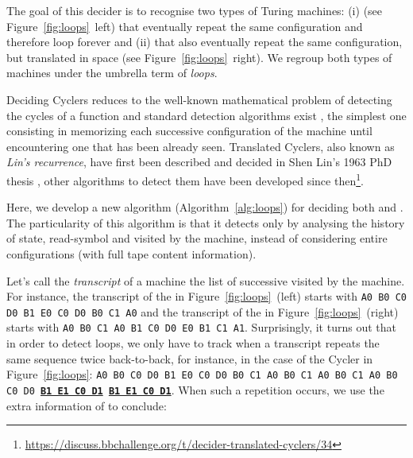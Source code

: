 
The goal of this decider is to recognise two types of Turing machines: (i) \textit{\cyclers} (see Figure~\ref{fig:loops}~left) that eventually repeat the same configuration and therefore loop forever and (ii) \textit{\TCs} that also eventually repeat the same configuration, but translated in space (see Figure~\ref{fig:loops}~right). We regroup both types of machines under the umbrella term of \textit{loops}.

Deciding Cyclers reduces to the well-known mathematical problem of detecting the cycles of a function and standard detection algorithms exist \cite{wiki:Cycle_detection}, the simplest one consisting in memorizing each successive configuration of the machine until encountering one that has been already seen. Translated Cyclers, also known as \textit{Lin's recurrence}, have first been described and decided in Shen Lin's 1963 PhD thesis \cite{Lin1963}, other algorithms to detect them have been developed since then\footnote{\url{https://discuss.bbchallenge.org/t/decider-translated-cyclers/34}}.

Here, we develop a new algorithm (Algorithm~\ref{alg:loops}) for deciding both \cyclers and \TCs. The particularity of this algorithm is that it detects \cyclers only by analysing the history of state, read-symbol and \headposs visited by the machine, instead of considering entire configurations (\ie with full tape content information).

Let's call the \textit{transcript} of a machine the list of successive \ssps visited by the machine. For instance, the transcript of the \cycler in Figure~\ref{fig:loops}~(left) starts with \texttt{A0 B0 C0 D0 B1 E0 C0 D0 B0 C1 A0} and the transcript of the \TC in Figure~\ref{fig:loops}~(right) starts with \texttt{A0 B0 C1 A0 B1 C0 D0 E0 B1 C1 A1}. Surprisingly, it turns out that in order to detect loops, we only have to track when a transcript repeats the same sequence twice back-to-back, for instance, in the case of the Cycler in Figure~\ref{fig:loops}: \texttt{A0 B0 C0 D0 B1 E0 C0 D0 B0 C1 A0 B0 C1 A0 B0 C1 A0 B0 C0 D0 \textbf{\underline{B1 E1 C0 D1}} \textbf{\underline{B1 E1 C0 D1}}}. When such a repetition occurs, we use the extra information of \headpos to conclude:

